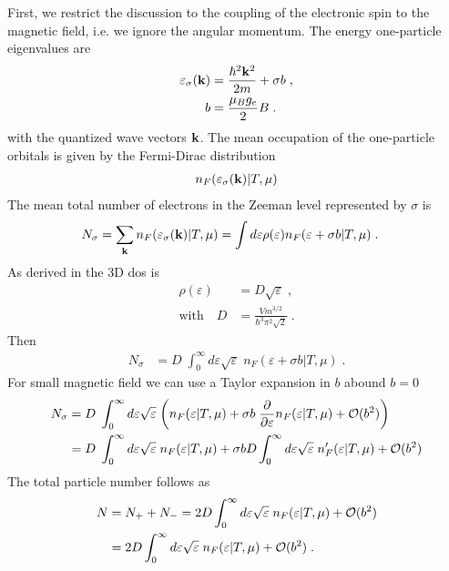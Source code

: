 First, we restrict the discussion to the coupling of the electronic spin to the magnetic field, i.e.
we ignore the angular momentum.
The energy one-particle eigenvalues are
%
\begin{align*}
\varepsilon_{\sigma}(\mathbf k) &= \frac{\hbar^{2} \mathbf k^{2}}{2m} +\sigma b\;,\\
b &= \frac{\mu_{B} g_{e} }{2}B\;.
\end{align*}
%
with the quantized wave vectors $\mathbf k$.
The mean occupation of the one-particle orbitals is given by the Fermi-Dirac distribution
%
\begin{align*}
n_{F}(\varepsilon_{\sigma}(\mathbf k)|T,\mu)
\end{align*}
%
The mean total number of electrons in the Zeeman level represented by $\sigma$ is
%
\begin{align*}
N_{\sigma} &=\sum_{\mathbf k} n_{F}(\varepsilon_{\sigma}(\mathbf k)|T,\mu)
= \int d\varepsilon \rho(\varepsilon) n_{F}(\varepsilon +\sigma b|T,\mu)\;.
\end{align*}
%
As derived in  the 3D dos is
%
%
\begin{subequations}\label{eq:para:pauli:1}
\begin{align}
\rho(\varepsilon)&= D \sqrt{\varepsilon}\;,\\
\text{with}\quad D&=\frac{V m^{3/2}}{\hbar^{3} \pi^{2}\sqrt{2}}\;.
\end{align}
\end{subequations}
%
Then
%
\begin{align*}
N_{\sigma} &=D\;
\int_{0}^{\infty} d\varepsilon \sqrt{\varepsilon} \; n_{F}(\varepsilon +\sigma b|T,\mu)\;.
\end{align*}
%
For small magnetic field we can use a Taylor expansion in $b$ abound $b=0$
%
\begin{align*}
N_{\sigma} &=D\;
\int_{0}^{\infty} d\varepsilon \sqrt{\varepsilon} \; 
\bigg(n_{F}(\varepsilon|T,\mu) +\sigma b \;\frac{\partial }{\partial \varepsilon}n_{F}(\varepsilon|T,\mu) +{\cal O}(b^{2})\bigg)\\
 &=D\;
\int_{0}^{\infty} d\varepsilon \sqrt{\varepsilon} \; 
n_{F}(\varepsilon|T,\mu) 
+\sigma b D \int_{0}^{\infty} d\varepsilon \sqrt{\varepsilon} \;n'_{F}(\varepsilon|T,\mu) +{\cal O}(b^{2})
\end{align*}
%
 The total particle number follows as
\begin{align}
N &= N_{+}+N_{-} = 2 D \int_{0}^{\infty} d\varepsilon \sqrt{\varepsilon} \;n_{F}
(\varepsilon|T,\mu) +
{\cal O}(b^{2})\notag\\
&= 2 D \int_{0}^{\infty} d\varepsilon \sqrt{\varepsilon} \;n_{F}
(\varepsilon|T,\mu) +
{\cal O}(b^{2})\;.\label{eq:N:total}
\end{align}
